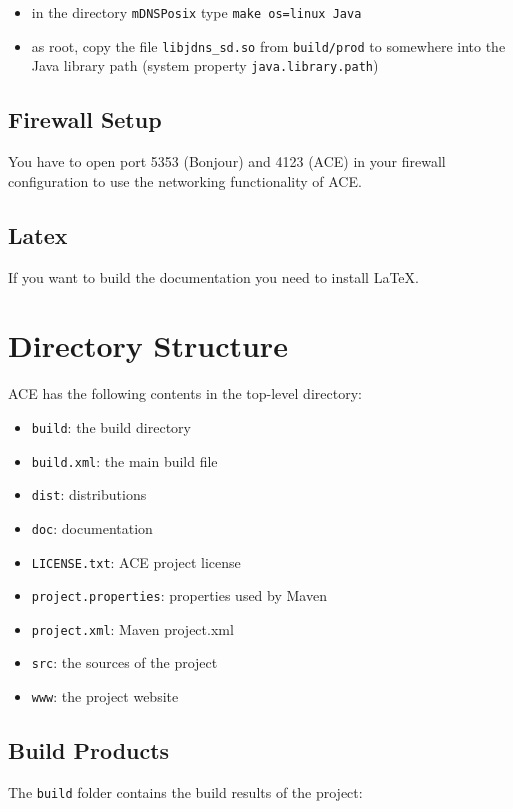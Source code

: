 \documentclass[11pt,a4paper]{article}
\begin{document}
\begin{itemize}
 \item in the directory \texttt{mDNSPosix} type \texttt{make os=linux Java}
 \item as root, copy the file \texttt{libjdns\_sd.so} from \texttt{build/prod} to somewhere into the Java library path (system property \texttt{java.library.path})
\end{itemize}


\subsection{Firewall Setup}
You have to open port 5353 (Bonjour) and 4123 (ACE) in your firewall configuration to use the networking functionality of ACE.


\subsection{Latex}
If you want to build the documentation you need to install \LaTeX{}.



\section{Directory Structure}
ACE has the following contents in the top-level directory:

\begin{itemize}
 \item \texttt{build}: the build directory
 \item \texttt{build.xml}: the main build file
 \item \texttt{dist}: distributions
 \item \texttt{doc}: documentation
 \item \texttt{LICENSE.txt}: ACE project license
 \item \texttt{project.properties}: properties used by Maven
 \item \texttt{project.xml}: Maven project.xml
 \item \texttt{src}: the sources of the project
 \item \texttt{www}: the project website
\end{itemize}


\subsection{Build Products}
The \texttt{build} folder contains the build results of the project:
\end{document}
